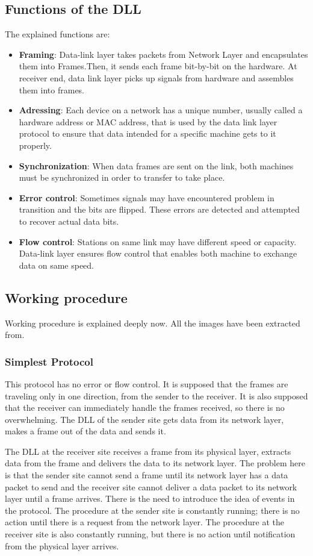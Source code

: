 \subsection{Functions of the DLL}
The explained functions are:

\begin{itemize}
\item \textbf{Framing}: Data-link layer takes packets from Network Layer and encapsulates them into Frames.Then, it sends each frame bit-by-bit on the hardware. At receiver end, data link layer picks up signals from hardware and assembles them into frames.
\item \textbf{Adressing}: Each device on a network has a unique number, usually called a hardware address or MAC address, that is used by the data link layer protocol to ensure that data intended for a specific machine gets to it properly.
\item \textbf{Synchronization}: When data frames are sent on the link, both machines must be synchronized in order to transfer to take place.
\item \textbf{Error control}: Sometimes signals may have encountered problem in transition and the bits are flipped. These errors are detected and attempted to recover actual data bits.
\item \textbf{Flow control}: Stations on same link may have different speed or capacity. Data-link layer ensures flow control that enables both machine to exchange data on same speed. 
\end{itemize}

\subsection{Working procedure}
Working procedure is explained deeply now. All the images have been extracted from\cite{Forouzan2012}.

\subsubsection{Simplest Protocol}
This protocol has no error or flow control. It is supposed that the frames are traveling only in one direction, from the sender to the receiver. It is also supposed that the receiver can immediately handle the frames received, so there is no overwhelming. The DLL of the sender site gets data from its network layer, makes a frame out of the data and sends it.

The DLL at the receiver site receives a frame from its physical layer, extracts data from the frame and delivers the data to its network layer. The problem here is that the sender site cannot send a frame until its network layer has a data packet to send and the receiver site cannot deliver a data packet to its network layer until a frame arrives. There is the need to introduce the idea of events in the protocol. The procedure at the sender site is constantly running; there is no action until there is a request from the network layer. The procedure at the receiver site is also constantly running, but there is no action until notification from the physical layer arrives.


